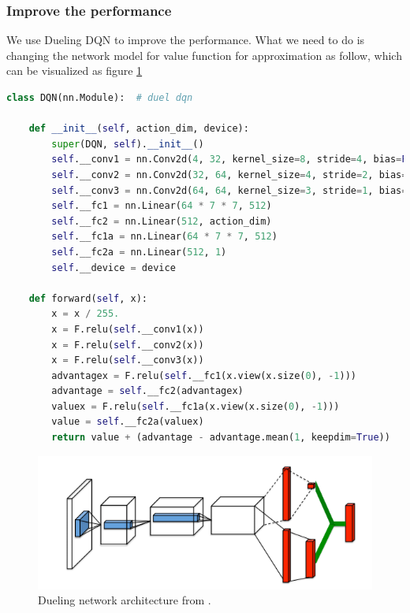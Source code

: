 \documentclass[a4paper, 11pt]{article}
\begin{document}
\subsubsection{Improve the performance}
We use Dueling DQN to improve the performance. What we need to do is changing the network model for value function for approximation as follow, which can be visualized as figure \ref{DUEL}
\begin{lstlisting}[language={python}]
class DQN(nn.Module):  # duel dqn

    def __init__(self, action_dim, device):
        super(DQN, self).__init__()
        self.__conv1 = nn.Conv2d(4, 32, kernel_size=8, stride=4, bias=False)
        self.__conv2 = nn.Conv2d(32, 64, kernel_size=4, stride=2, bias=False)
        self.__conv3 = nn.Conv2d(64, 64, kernel_size=3, stride=1, bias=False)
        self.__fc1 = nn.Linear(64 * 7 * 7, 512)
        self.__fc2 = nn.Linear(512, action_dim) 
        self.__fc1a = nn.Linear(64 * 7 * 7, 512)  
        self.__fc2a = nn.Linear(512, 1) 
        self.__device = device

    def forward(self, x):
        x = x / 255.
        x = F.relu(self.__conv1(x))
        x = F.relu(self.__conv2(x))
        x = F.relu(self.__conv3(x))
        advantagex = F.relu(self.__fc1(x.view(x.size(0), -1)))
        advantage = self.__fc2(advantagex)
        valuex = F.relu(self.__fc1a(x.view(x.size(0), -1)))
        value = self.__fc2a(valuex)
        return value + (advantage - advantage.mean(1, keepdim=True)) 
	\end{lstlisting}
\begin{figure}[ht]
      \centering
      \includegraphics[width = 0.8 \textwidth]{dueling}
      \caption{Dueling network architecture from \cite{ref6}.}
      \label{DUEL}
\end{figure}
\end{document}
